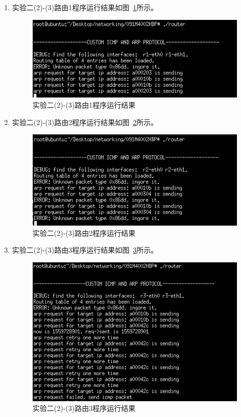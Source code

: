 \documentclass{zjureport}
\begin{document}
\begin{enumerate}
         \item 实验二(2)-(3)路由1程序运行结果如图~\ref{fig:e2program1}所示。
                 \begin{figure}[!htbp]
                     \centering
                     \includegraphics[width=0.7\linewidth]{figures/e2program1.png}
                     \caption{实验二(2)-(3)路由1程序运行结果}
                     \label{fig:e2program1}
                 \end{figure}

        \item 实验二(2)-(3)路由2程序运行结果如图~\ref{fig:e2program2}所示。
                \begin{figure}[!htbp]
                    \centering
                    \includegraphics[width=0.7\linewidth]{figures/e2program2.png}
                    \caption{实验二(2)-(3)路由2程序运行结果}
                    \label{fig:e2program2}
                \end{figure}

        \item 实验二(2)-(3)路由3程序运行结果如图~\ref{fig:e2program3}所示。
                \begin{figure}[!htbp]
                    \centering
                    \includegraphics[width=0.7\linewidth]{figures/e2program3.png}
                    \caption{实验二(2)-(3)路由3程序运行结果}
                    \label{fig:e2program3}
                \end{figure}

      \end{enumerate}
\end{document}
